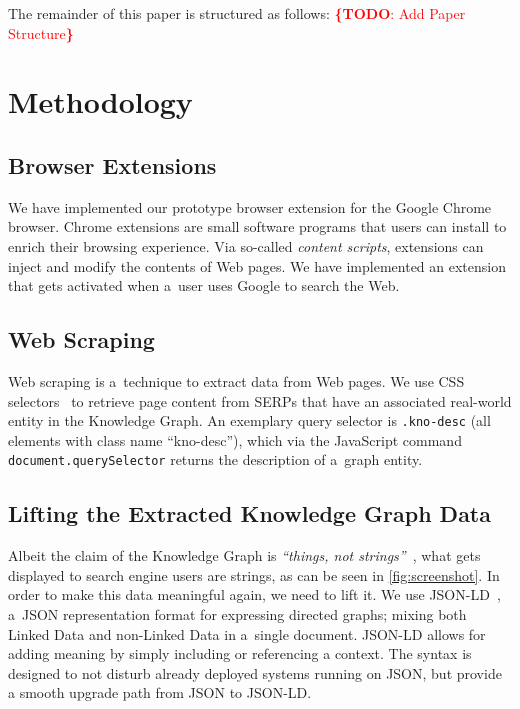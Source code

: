 \documentclass[runningheads,a4paper]{llncs}
\newcommand{\todo}[1]{\noindent\textcolor{red}{{\bf \{TODO}: #1{\bf \}}}}
\begin{document}
The remainder of this paper is structured as follows:
\todo{Add Paper Structure}

\section{Methodology}
\subsection{Browser Extensions}
We have implemented our prototype browser extension for the Google Chrome browser.
Chrome extensions are small software programs that users can install
to enrich their browsing experience.
Via so-called \emph{content scripts},
extensions can inject and modify the contents of Web pages.
We have implemented an extension that gets activated when a~user
uses Google to search the Web.

\subsection{Web Scraping}
Web scraping is a~technique to extract data from Web pages.
We use CSS selectors~\cite{hunt2012} to retrieve page content from SERPs
that have an associated real-world entity in the Knowledge Graph.
An exemplary query selector is \texttt{.kno-desc}
(all elements with class name ``kno-desc''),
which via the JavaScript command \texttt{document.querySelector}
returns the description of a~graph entity.

\subsection{Lifting the Extracted Knowledge Graph Data}
Albeit the claim of the Knowledge Graph is
\textit{``things, not strings''}~\cite{singhal2012},
what gets displayed to search engine users are strings,
as can be seen in \autoref{fig:screenshot}.
In order to make this data meaningful again, we need to lift it.
We use JSON-LD~\cite{sporny2012}, a~JSON representation format
for expressing directed graphs;
mixing both Linked Data and non-Linked Data in a~single document.
JSON-LD allows for adding meaning by simply including or referencing a context.
The syntax is designed to not disturb already deployed systems running on JSON,
but provide a smooth upgrade path from JSON to JSON-LD.
\end{document}
